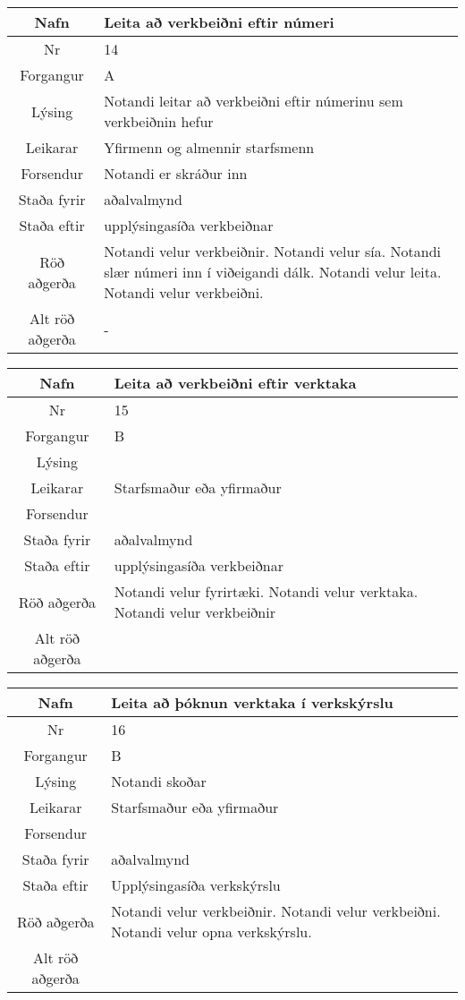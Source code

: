 \begin{table}[h!]\centering
\begin{tabular}{|c|p{10cm}|}
\hline
Nafn&Leita að verkbeiðni eftir númeri\\
\hline
Nr&14\\
\hline
Forgangur&A\\
\hline
Lýsing&Notandi leitar að verkbeiðni eftir númerinu sem verkbeiðnin hefur\\
\hline
Leikarar&Yfirmenn og almennir starfsmenn\\
\hline
Forsendur&Notandi er skráður inn\\
\hline
Staða fyrir&aðalvalmynd\\
\hline
Staða eftir&upplýsingasíða verkbeiðnar\\
\hline
Röð aðgerða&Notandi velur verkbeiðnir. Notandi velur sía. Notandi slær númeri inn í viðeigandi dálk. Notandi velur leita. Notandi velur verkbeiðni.\\
\hline
Alt röð aðgerða&-\\
\hline
\end{tabular}
\end{table}
\caption{Use case 14}\label{tab:use_case_14}
\begin{table}[h!]\centering
\begin{tabular}{|c|p{10cm}|}
\hline
Nafn&Leita að verkbeiðni eftir verktaka\\
\hline
Nr&15\\
\hline
Forgangur&B\\
\hline
Lýsing&\\
\hline
Leikarar&Starfsmaður eða yfirmaður\\
\hline
Forsendur&\\
\hline
Staða fyrir&aðalvalmynd\\
\hline
Staða eftir&upplýsingasíða verkbeiðnar\\
\hline
Röð aðgerða&Notandi velur fyrirtæki. Notandi velur verktaka. Notandi velur verkbeiðnir\\
\hline
Alt röð aðgerða&\\
\hline
\end{tabular}
\end{table}
\caption{Use case 15}\label{tab:use_case_15}
\begin{table}[h!]\centering
\begin{tabular}{|c|p{10cm}|}
\hline
Nafn&Leita að þóknun verktaka í verkskýrslu\\
\hline
Nr&16\\
\hline
Forgangur&B\\
\hline
Lýsing&Notandi skoðar\\
\hline
Leikarar&Starfsmaður eða yfirmaður\\
\hline
Forsendur&\\
\hline
Staða fyrir&aðalvalmynd\\
\hline
Staða eftir&Upplýsingasíða verkskýrslu\\
\hline
Röð aðgerða&Notandi velur verkbeiðnir. Notandi velur verkbeiðni. Notandi velur opna verkskýrslu.\\
\hline
Alt röð aðgerða&\\
\hline
\end{tabular}
\end{table}
